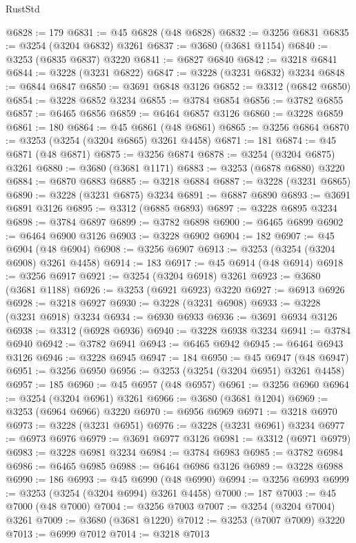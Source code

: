 \begin{lexlean}{RustStd}
\begin{coremodule}
@6828 := 179
@6831 := @45 @6828 (@48 @6828)
@6832 := @3256 @6831
@6835 := @3254 (@3204 @6832) @3261
@6837 := @3680 (@3681 @1154)
@6840 := @3253 (@6835 @6837) @3220
@6841 := @6827 @6840
@6842 := @3218 @6841
@6844 := @3228 (@3231 @6822)
@6847 := @3228 (@3231 @6832) @3234
@6848 := @6844 @6847
@6850 := @3691 @6848 @3126
@6852 := @3312 (@6842 @6850)
@6854 := @3228 @6852 @3234
@6855 := @3784 @6854
@6856 := @3782 @6855
@6857 := @6465 @6856
@6859 := @6464 @6857 @3126
@6860 := @3228 @6859
@6861 := 180
@6864 := @45 @6861 (@48 @6861)
@6865 := @3256 @6864
@6870 := @3253 (@3254 (@3204 @6865) @3261 @4458)
@6871 := 181
@6874 := @45 @6871 (@48 @6871)
@6875 := @3256 @6874
@6878 := @3254 (@3204 @6875) @3261
@6880 := @3680 (@3681 @1171)
@6883 := @3253 (@6878 @6880) @3220
@6884 := @6870 @6883
@6885 := @3218 @6884
@6887 := @3228 (@3231 @6865)
@6890 := @3228 (@3231 @6875) @3234
@6891 := @6887 @6890
@6893 := @3691 @6891 @3126
@6895 := @3312 (@6885 @6893)
@6897 := @3228 @6895 @3234
@6898 := @3784 @6897
@6899 := @3782 @6898
@6900 := @6465 @6899
@6902 := @6464 @6900 @3126
@6903 := @3228 @6902
@6904 := 182
@6907 := @45 @6904 (@48 @6904)
@6908 := @3256 @6907
@6913 := @3253 (@3254 (@3204 @6908) @3261 @4458)
@6914 := 183
@6917 := @45 @6914 (@48 @6914)
@6918 := @3256 @6917
@6921 := @3254 (@3204 @6918) @3261
@6923 := @3680 (@3681 @1188)
@6926 := @3253 (@6921 @6923) @3220
@6927 := @6913 @6926
@6928 := @3218 @6927
@6930 := @3228 (@3231 @6908)
@6933 := @3228 (@3231 @6918) @3234
@6934 := @6930 @6933
@6936 := @3691 @6934 @3126
@6938 := @3312 (@6928 @6936)
@6940 := @3228 @6938 @3234
@6941 := @3784 @6940
@6942 := @3782 @6941
@6943 := @6465 @6942
@6945 := @6464 @6943 @3126
@6946 := @3228 @6945
@6947 := 184
@6950 := @45 @6947 (@48 @6947)
@6951 := @3256 @6950
@6956 := @3253 (@3254 (@3204 @6951) @3261 @4458)
@6957 := 185
@6960 := @45 @6957 (@48 @6957)
@6961 := @3256 @6960
@6964 := @3254 (@3204 @6961) @3261
@6966 := @3680 (@3681 @1204)
@6969 := @3253 (@6964 @6966) @3220
@6970 := @6956 @6969
@6971 := @3218 @6970
@6973 := @3228 (@3231 @6951)
@6976 := @3228 (@3231 @6961) @3234
@6977 := @6973 @6976
@6979 := @3691 @6977 @3126
@6981 := @3312 (@6971 @6979)
@6983 := @3228 @6981 @3234
@6984 := @3784 @6983
@6985 := @3782 @6984
@6986 := @6465 @6985
@6988 := @6464 @6986 @3126
@6989 := @3228 @6988
@6990 := 186
@6993 := @45 @6990 (@48 @6990)
@6994 := @3256 @6993
@6999 := @3253 (@3254 (@3204 @6994) @3261 @4458)
@7000 := 187
@7003 := @45 @7000 (@48 @7000)
@7004 := @3256 @7003
@7007 := @3254 (@3204 @7004) @3261
@7009 := @3680 (@3681 @1220)
@7012 := @3253 (@7007 @7009) @3220
@7013 := @6999 @7012
@7014 := @3218 @7013

\end{coremodule}
\end{lexlean}
